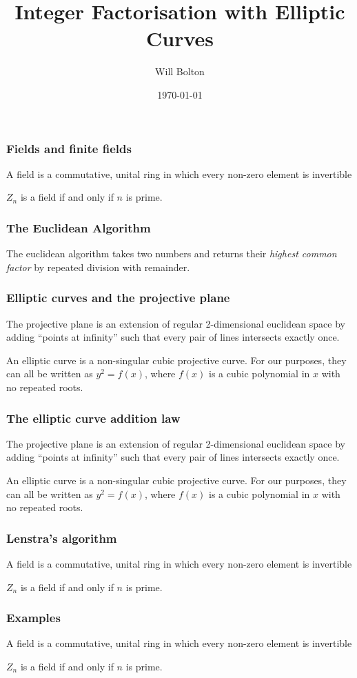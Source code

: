 \documentclass{beamer}
\title[Integer Factorisation with Elliptic Curves]{Integer Factorisation with Elliptic Curves}
\author{Will Bolton}
\date{\today}
\begin{document}
\titlepage
\begin{frame} %
\frametitle{Fields and finite fields}
\begin{definition}
	A field is a commutative, unital ring in which every non-zero element is invertible
\end{definition}
\begin{definition}
	$Z_n$ is a field if and only if $n$ is prime.
\end{definition}
\end{frame}

\begin{frame} %
\frametitle{The Euclidean Algorithm}
\begin{definition}
	The euclidean algorithm takes two numbers and returns their \emph{highest common factor} by repeated division with remainder.
\end{definition}
\end{frame}

\begin{frame} %
\frametitle{Elliptic curves and the projective plane}
\begin{definition}
	The projective plane is an extension of regular 2-dimensional euclidean space by adding ``points at infinity'' such that every pair of lines intersects exactly once.
\end{definition}
\begin{definition}
	An elliptic curve is a non-singular cubic projective curve. For our purposes, they can all be written as $y^2 = f(x)$, where $f(x)$ is a cubic polynomial in $x$ with no repeated roots.
\end{definition}
\end{frame}

\begin{frame} %
\frametitle{The elliptic curve addition law}
\begin{definition}
	The projective plane is an extension of regular 2-dimensional euclidean space by adding ``points at infinity'' such that every pair of lines intersects exactly once.
\end{definition}
\begin{definition}
	An elliptic curve is a non-singular cubic projective curve. For our purposes, they can all be written as $y^2 = f(x)$, where $f(x)$ is a cubic polynomial in $x$ with no repeated roots.
\end{definition}
\end{frame}

\begin{frame} %
\frametitle{Lenstra's algorithm}
\begin{definition}
	A field is a commutative, unital ring in which every non-zero element is invertible
\end{definition}
\begin{definition}
	$Z_n$ is a field if and only if $n$ is prime.
\end{definition}
\end{frame}

\begin{frame} %
\frametitle{Examples}
\begin{definition}
	A field is a commutative, unital ring in which every non-zero element is invertible
\end{definition}
\begin{definition}
	$Z_n$ is a field if and only if $n$ is prime.
\end{definition}
\end{frame}
\end{document}
